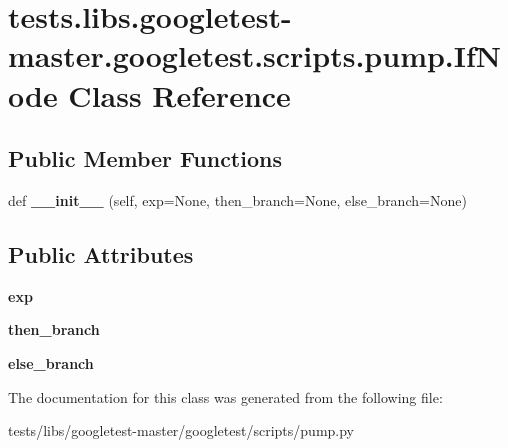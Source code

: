 \hypertarget{classtests_1_1libs_1_1googletest-master_1_1googletest_1_1scripts_1_1pump_1_1IfNode}{}\section{tests.\+libs.\+googletest-\/master.googletest.\+scripts.\+pump.\+If\+Node Class Reference}
\label{classtests_1_1libs_1_1googletest-master_1_1googletest_1_1scripts_1_1pump_1_1IfNode}
\subsection*{Public Member Functions}
\begin{DoxyCompactItemize}
\item 
\mbox{\label{classtests_1_1libs_1_1googletest-master_1_1googletest_1_1scripts_1_1pump_1_1IfNode_a5ba07b70fa3083bb0d79432b24c24bb1}} 
def {\bfseries \+\_\+\+\_\+init\+\_\+\+\_\+} (self, exp=None, then\+\_\+branch=None, else\+\_\+branch=None)
\end{DoxyCompactItemize}
\subsection*{Public Attributes}
\begin{DoxyCompactItemize}
\item 
\mbox{\label{classtests_1_1libs_1_1googletest-master_1_1googletest_1_1scripts_1_1pump_1_1IfNode_ac31b82d03a110f02826e95c504fa74f1}} 
{\bfseries exp}
\item 
\mbox{\label{classtests_1_1libs_1_1googletest-master_1_1googletest_1_1scripts_1_1pump_1_1IfNode_a9a7524504baa1e6a3f4385d165d94f7a}} 
{\bfseries then\+\_\+branch}
\item 
\mbox{\label{classtests_1_1libs_1_1googletest-master_1_1googletest_1_1scripts_1_1pump_1_1IfNode_a38407eef37f4600e015d0dbfea64b502}} 
{\bfseries else\+\_\+branch}
\end{DoxyCompactItemize}


The documentation for this class was generated from the following file\+:\begin{DoxyCompactItemize}
\item 
tests/libs/googletest-\/master/googletest/scripts/pump.\+py\end{DoxyCompactItemize}

